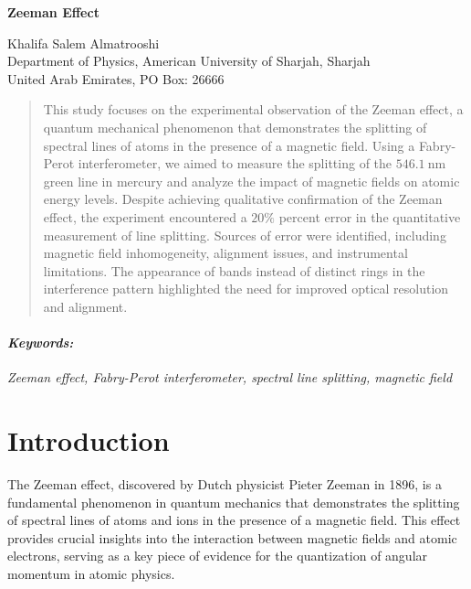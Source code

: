 \documentclass[11pt]{article}
\begin{document}
	
	\begin{titlepage}
		\begin{center}
			\begin{Large}
				\textbf{Zeeman Effect} \\
			\end{Large}
			\vspace{0.5cm}
			Khalifa Salem Almatrooshi \\
			\vspace{0.5cm}
			Department of Physics, American University of Sharjah, Sharjah \\
			United Arab Emirates, PO Box: 26666
		\end{center}
		\begin{abstract}
			\noindent
			This study focuses on the experimental observation of the Zeeman effect, a quantum mechanical phenomenon that demonstrates the splitting of spectral lines of atoms in the presence of a magnetic field. Using a Fabry-Perot interferometer, we aimed to measure the splitting of the $\qty{546.1}{\nano\meter}$ green line in mercury and analyze the impact of magnetic fields on atomic energy levels. Despite achieving qualitative confirmation of the Zeeman effect, the experiment encountered a $20\%$ percent error in the quantitative measurement of line splitting. Sources of error were identified, including magnetic field inhomogeneity, alignment issues, and instrumental limitations. The appearance of bands instead of distinct rings in the interference pattern highlighted the need for improved optical resolution and alignment.
		\end{abstract}
		\paragraph{\textit{Keywords:}} \textit{Zeeman effect, Fabry-Perot interferometer, spectral line splitting, magnetic field}
	\end{titlepage}
	
\clearpage
	
	\section{Introduction}
	
	The Zeeman effect, discovered by Dutch physicist Pieter Zeeman in 1896, is a fundamental phenomenon in quantum mechanics that demonstrates the splitting of spectral lines of atoms and ions in the presence of a magnetic field. This effect provides crucial insights into the interaction between magnetic fields and atomic electrons, serving as a key piece of evidence for the quantization of angular momentum in atomic physics.
	
\end{document}

